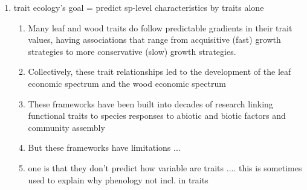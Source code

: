 \documentclass{article}
\begin{document}
\begin{enumerate}

\item trait ecology’s goal = predict sp-level characteristics by traits alone %
\begin{enumerate}
\item Many leaf and wood traits do follow predictable gradients in their trait values, having associations that range from acquisitive (fast) growth strategies to more conservative (slow) growth strategies.
\item Collectively, these trait relationships led to the development of the leaf economic spectrum and the wood economic spectrum
\item These frameworks have been built into decades of research linking functional traits to species responses to abiotic and biotic factors and community assembly
\item But these frameworks have limitations ... 
\item one is that they don't predict how variable are traits .... this is sometimes used to explain why phenology not incl. in traits %
\end{enumerate}


\end{enumerate}
\end{document}
